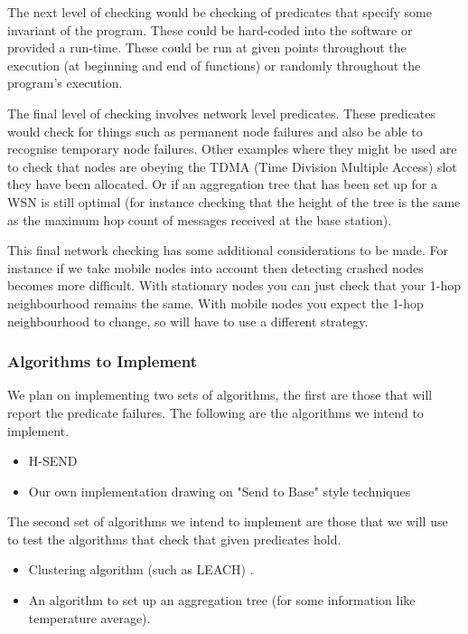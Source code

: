 \documentclass[a4paper]{article}
\begin{document}
The next level of checking would be checking of predicates that specify some invariant of the program. These could be hard-coded into the software or provided a run-time. These could be run at given points throughout the execution (at beginning and end of functions) or randomly throughout the program's execution.

The final level of checking involves network level predicates. These predicates would check for things such as permanent node failures and also be able to recognise temporary node failures. Other examples where they might be used are to check that nodes are obeying the TDMA (Time Division Multiple Access) slot they have been allocated. Or if an aggregation tree \cite{TankBible} that has been set up for a WSN is still optimal (for instance checking that the height of the tree is the same as the maximum hop count of messages received at the base station).

This final network checking has some additional considerations to be made. For instance if we take mobile nodes into account then detecting crashed nodes becomes more difficult. With stationary nodes you can just check that your 1-hop neighbourhood remains the same. With mobile nodes you expect the 1-hop neighbourhood to change, so will have to use a different strategy.


\subsubsection{Algorithms to Implement}

We plan on implementing two sets of algorithms, the first are those that will report the predicate failures. The following are the algorithms we intend to implement.

\begin{itemize}
	\item H-SEND \cite{herbert2007adaptive}
	\item Our own implementation drawing on "Send to Base" style techniques \cite{?}
\end{itemize}

The second set of algorithms we intend to implement are those that we will use to test the algorithms that check that given predicates hold.

\begin{itemize}
	\item Clustering algorithm (such as LEACH) \cite{herbert2007adaptive}.
	\item An algorithm to set up an aggregation tree (for some information like temperature average). \cite{TankBible}
\end{itemize}
\end{document}
